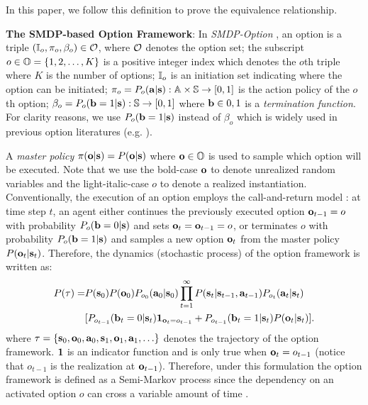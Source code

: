 \documentclass[10pt,journal,compsoc]{IEEEtran}
\renewcommand{\cite}{\citep}
\begin{document}
In this paper, we follow this definition to prove the equivalence
relationship.

\textbf{The SMDP-based Option Framework}: In \emph{SMDP-Option}
\cite{sutton1999between,bacon2018temporal}, an option is a triple
$({\mathbb{I}}_o, \pi_o, \beta_o)\in {\mathcal{O}}$, where ${\mathcal{O}}$ denotes the option
set; the subscript $o\in{\mathbb{O}}=\{1,2,\dots,K\}$ is a positive
integer index which denotes the $o$th triple where $K$ is the
number of options; ${\mathbb{I}}_o$ is an initiation set indicating where
the option can be initiated;
$\pi_o=P_o({\mathbf{a}}|{\mathbf{s}}):{\mathbb{A}}\times{\mathbb{S}}\rightarrow[0,1]$ is the action
policy of the $o$th option;
$\beta_o=P_o({\mathbf{b}}=1|{\mathbf{s}}):{\mathbb{S}}\rightarrow[0,1]$ where ${\mathbf{b}}\in
{0,1}$ is a \emph{termination function}. For clarity reasons, we
use $P_o({\mathbf{b}}=1|{\mathbf{s}})$ instead of $\beta_o$ which is widely used
in previous option literatures (e.g.
\cite{sutton1999between,bacon2017option}).

A \emph{master policy} $\pi({\mathbf{o}}|{\mathbf{s}})=P({\mathbf{o}}|{\mathbf{s}})$ where
${\mathbf{o}}\in{\mathbb{O}}$ is used to sample which option will be executed.
Note that we use the bold-case ${\mathbf{o}}$ to denote unrealized random
variables and the light-italic-case $o$ to denote a realized
instantiation. Conventionally, the execution of an option employs
the call-and-return model \cite{sutton1999between}: at time step
$t$, an agent either continues the previously executed option
${\mathbf{o}}_{t-1}=o$ with probability $P_o({\mathbf{b}}=0|{\mathbf{s}})$ and sets
${\mathbf{o}}_t={\mathbf{o}}_{t-1}=o$, or terminates $o$ with probability
$P_o({\mathbf{b}}=1|{\mathbf{s}})$ and samples a new option ${\mathbf{o}}_t$ from the
master policy $P({\mathbf{o}}_t|{\mathbf{s}}_t)$. Therefore, the dynamics
(stochastic process) of the option framework is written as:
\begin{align}
  \label{eq:oc_pgm_joint}
  P(\tau) = &P(\rvs_0)P(\rvo_0)P_{o_0}(\rva_0|\rvs_0)\prod_{t=1}^\infty P(\rvs_t|\rvs_{t-1},\rva_{t-1})P_{o_t}(\rva_{t}|\rvs_{t})\nonumber\\
            &[P_{o_{t-1}}(\rvb_t=0|\rvs_t)\1_{\rvo_t=o_{t-1}} +P_{o_{t-1}}(\rvb_t=1|\rvs_t)P(\rvo_t|\rvs_t)].
\end{align}
where $\tau=\{{\mathbf{s}}_0,{\mathbf{o}}_0,{\mathbf{a}}_0,{\mathbf{s}}_1,{\mathbf{o}}_1,{\mathbf{a}}_1,\ldots\}$
denotes the trajectory of the option framework. $\bm{1}$ is an
indicator function and is only true when ${\mathbf{o}}_t=o_{t-1}$ (notice
that $o_{t-1}$ is the realization at ${\mathbf{o}}_{t-1}$). Therefore,
under this formulation the option framework is defined as a
Semi-Markov process since the dependency on an activated option
$o$ can cross a variable amount of time \cite{sutton1999between}.
\end{document}
